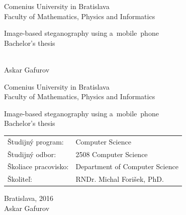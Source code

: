 \documentclass[12pt, oneside]{book}
\def\mfrok{2016}
\def\mfnazov{Image-based steganography using a~mobile~phone}
\def\mftyp{Bachelor's thesis}
\def\mfautor{Askar Gafurov}
\def\mfskolitel{RNDr. Michal Forišek, PhD.}
\def\mfkonzultant{tit. Meno Priezvisko, tit. }
\def\mfmiesto{Bratislava, \mfrok}
\def\mfodbor{2508 Computer Science}
\def\program{ Computer Science }
\def\mfpracovisko{ Department of Computer Science }
\begin{document}
     

\thispagestyle{empty}

\begin{center}
\sc\large
Comenius University in Bratislava\\
Faculty of Mathematics, Physics and Informatics


\vfill

{\LARGE\mfnazov}\\
\mftyp
\end{center}

\vfill

{\sc\large 
\noindent \mfrok\\
\mfautor
}

\eject %


\thispagestyle{empty}
\noindent

\begin{center}
\sc  
\large
Comenius University in Bratislava\\
Faculty of Mathematics, Physics and Informatics

\vfill

{\LARGE\mfnazov}\\
\mftyp
\end{center}

\vfill

\noindent
\begin{tabular}{ll}
Študijný program: & \program \\
Študijný odbor: & \mfodbor \\
Školiace pracovisko: & \mfpracovisko \\
Školiteľ: & \mfskolitel \\
\end{tabular}

\vfill


\noindent \mfmiesto\\
\mfautor

\eject %




\end{document}
